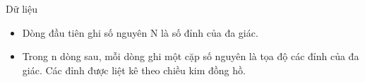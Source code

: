 Dữ liệu
\begin{itemize}
	\item     Dòng đầu tiên ghi số nguyên N là số đỉnh của đa giác.   
	\item     Trong n dòng sau, mỗi dòng ghi một cặp số nguyên là tọa độ các đỉnh của đa giác. Các đỉnh được liệt kê theo chiều kim đồng hồ.   
\end{itemize}